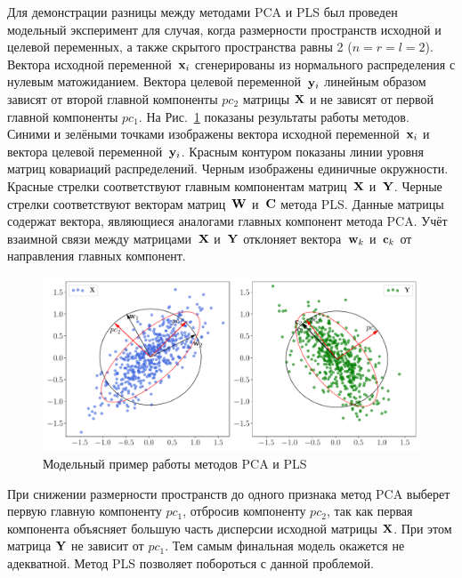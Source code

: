Для демонстрации разницы между методами PCA и PLS был проведен модельный эксперимент для случая, когда размерности пространств исходной и целевой переменных, а также скрытого пространства равны 2 ($n = r = l = 2$).
Вектора исходной переменной~$\mathbf{x}_i$ сгенерированы из нормального распределения с нулевым матожиданием. 
Вектора целевой переменной~$\mathbf{y}_i$ линейным образом зависят от второй  главной компоненты $pc_2$ матрицы $\mathbf{X}$ и не зависят от первой главной компоненты $pc_1$.
На Рис.~\ref{ch1:fig:pls_toy_example} показаны результаты работы методов. 
Синими и зелёными точками изображены вектора исходной переменной~$\mathbf{x}_i$ и вектора целевой переменной~$\mathbf{y}_i$. 
Красным контуром показаны линии уровня матриц ковариаций распределений. 
Черным изображены единичные окружности. 
Красные стрелки соответствуют главным компонентам матриц~$\mathbf{X}$ и~$\mathbf{Y}$. 
Черные стрелки соответствуют векторам матриц~$\mathbf{W}$ и~$\mathbf{C}$ метода PLS. 
Данные матрицы содержат вектора, являющиеся аналогами главных компонент метода PCA.
Учёт взаимной связи между матрицами~$\mathbf{X}$ и~$\mathbf{Y}$ отклоняет вектора~$\mathbf{w}_k$ и~$\mathbf{c}_k$ от направления главных компонент. 
\begin{figure}[h]
	\centering
	\includegraphics[width=\linewidth]{figs/ch1/pls_toy_example}
	\caption{Модельный пример работы методов PCA и PLS}
	\label{ch1:fig:pls_toy_example}
\end{figure}

При снижении размерности пространств до одного признака метод PCA выберет первую главную компоненту $pc_1$, отбросив компоненту $pc_2$, так как первая компонента объясняет большую часть дисперсии исходной матрицы $\mathbf{X}$. 
При этом матрица $\mathbf{Y}$ не зависит от $pc_1$. 
Тем самым финальная модель окажется не адекватной.
Метод PLS позволяет побороться с данной проблемой.

